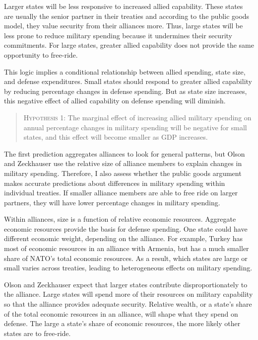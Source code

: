 \documentclass[12pt]{article}
\begin{document}
 
Larger states will be less responsive to increased allied capability. 
These states are usually the senior partner in their treaties and according to the public goods model, they value security from their alliances more. 
Thus, large states will be less prone to reduce military spending because it undermines their security commitments. 
For large states, greater allied capability does not provide the same opportunity to free-ride.


This logic implies a conditional relationship between allied spending, state size, and defense expenditures. 
Small states should respond to greater allied capability by reducing percentage changes in defense spending. 
But as state size increases, this negative effect of allied capability on defense spending will diminish. 


\begin{quote}
\textsc{Hypothesis 1}: The marginal effect of increasing allied military spending on annual percentage changes in military spending will be negative for small states, and this effect will become smaller as GDP increases. 
\end{quote}


The first prediction aggregates alliances to look for general patterns, but Olson and Zeckhauser use the relative size of alliance members to explain changes in military spending. 
Therefore, I also assess whether the public goods argument makes accurate predictions about differences in military spending within individual treaties. 
If smaller alliance members are able to free ride on larger partners, they will have lower percentage changes in military spending.  

 
Within alliances, size is a function of relative economic resources.
Aggregate economic resources provide the basis for defense spending. 
One state could have different economic weight, depending on the alliance. 
For example, Turkey has most of economic resources in an alliance with Armenia, but has a much smaller share of NATO's total economic resources. 
As a result, which states are large or small varies across treaties, leading to heterogeneous effects on military spending. 


Olson and Zeckhauser expect that larger states contribute disproportionately to the alliance. 
Large states will spend more of their resources on military capability so that the alliance provides adequate security. 
Relative wealth, or a state's share of the total economic resources in an alliance, will shape what they spend on defense. 
The large a state's share of economic resources, the more likely other states are to free-ride. 
\end{document}
